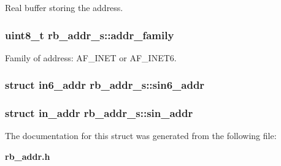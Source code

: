 Real buffer storing the address. 

\subsubsection[{addr\_family}]{\setlength{\rightskip}{0pt plus 5cm}uint8\_t rb\_addr\_s\+::addr\_family}\label{structrb__addr__s_a0eab82f9cdc545c452068f24a8f64cc1}


Family of address\+: A\+F\_\+I\+N\+E\+T or A\+F\_\+I\+N\+E\+T6. 

\subsubsection[{sin6\_addr}]{\setlength{\rightskip}{0pt plus 5cm}struct in6\_addr rb\_addr\_s\+::sin6\_addr}\label{structrb__addr__s_a272dcafb5295c1f8d999f860a96b2fd5}
\subsubsection[{sin\_addr}]{\setlength{\rightskip}{0pt plus 5cm}struct in\_addr rb\_addr\_s\+::sin\_addr}\label{structrb__addr__s_ac26433c8034f129ed3f06f44e63df305}


The documentation for this struct was generated from the following file\+:\begin{DoxyCompactItemize}
\item 
{\bf rb\_addr.\+h}\end{DoxyCompactItemize}

